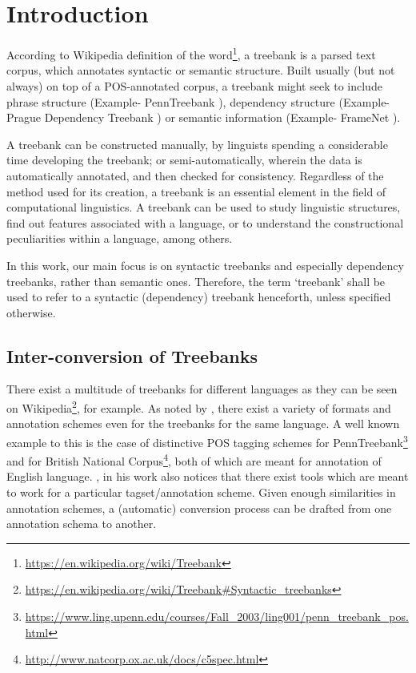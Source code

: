 \chapter{Introduction}

According to Wikipedia definition of the word\footnote{\url{https://en.wikipedia.org/wiki/Treebank}}, a treebank is a parsed text corpus, which annotates syntactic or semantic structure. Built usually (but not always) on top of a POS-annotated corpus, a treebank might seek to include phrase structure (Example- PennTreebank \citep{PennTreebank}), dependency structure (Example- Prague Dependency Treebank \citep{PDT}) or semantic information (Example- FrameNet \citep{framenet}).

A treebank can be constructed manually, by linguists spending a considerable time developing the treebank; or semi-automatically, wherein the data is automatically annotated, and then checked for consistency. Regardless of the method used for its creation, a treebank is an essential element in the field of computational linguistics. A treebank can be used to study linguistic structures, find out features associated with a language, or to understand the constructional peculiarities within a language, among others. 

In this work, our main focus is on syntactic treebanks and especially dependency treebanks, rather than semantic ones. Therefore, the term `treebank' shall be used to refer to a syntactic (dependency) treebank henceforth, unless specified otherwise.

\section{Inter-conversion of Treebanks}

There exist a multitude of treebanks for different languages as they can be seen on Wikipedia\footnote{\url{https://en.wikipedia.org/wiki/Treebank\#Syntactic_treebanks}}, for example. As noted by \cite{kakkonen2006}, there exist a variety of formats and annotation schemes even for the treebanks for the same language. A well known example to this is the case of distinctive POS tagging schemes for PennTreebank\footnote{\url{https://www.ling.upenn.edu/courses/Fall_2003/ling001/penn_treebank_pos.html}} and for British National Corpus\footnote{\url{http://www.natcorp.ox.ac.uk/docs/c5spec.html}}, both of which are meant for annotation of English language. \citeauthor{kakkonen2006}, in his work also notices that there exist tools which are meant to work for a particular tagset/annotation scheme. Given enough similarities in annotation schemes, a (automatic) conversion process can be drafted from one annotation schema to another.

